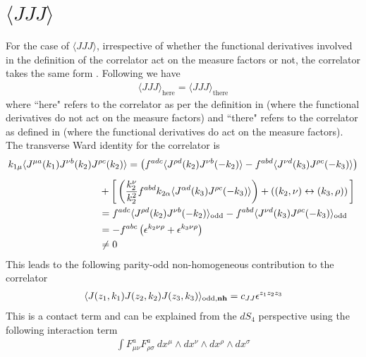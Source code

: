 \documentclass[a4paper,11pt]{article}
\begin{document}
 \section*{$\langle JJJ\rangle $}
 For the case of $\langle JJJ\rangle $, irrespective of whether the functional derivatives involved in the definition of the correlator act on the measure factors or not, the correlator takes the same form \cite{Bzowski:2017poo}. Following \cite{Bzowski:2017poo} we have
 \begin{align}
 \langle JJJ\rangle_{\text{here}}=\langle JJJ\rangle_{\text{there}}
 \end{align}
 where ``here" refers to the correlator as per the definition in \cite{Bzowski:2017poo} (where the functional derivatives do not act on the measure factors)  and ``there" refers to the correlator as defined in \cite{Bzowski:2013sza} (where the functional derivatives do act on the measure factors).  The transverse Ward identity for the correlator is \cite{Bzowski:2013sza} 
 \begin{align}
\label{WTjjj}
\begin{split}
k_{1\mu}\langle J^{\mu a}(k_1) J^{\nu b}(k_2) J^{\rho c}(k_2) \rangle &= \left(f^{adc}\langle J^{\rho d}(k_2)J^{\nu b}(-k_2) \rangle-f^{abd}\langle J^{\nu d}(k_3)J^{\rho c}(-k_3)\rangle\right)\\[5 pt]
&\hspace{-1cm}+\bigg[\left(\frac{k_2^{\nu}}{ k_2^2}f^{abd}k_{2\alpha}\langle J^{\alpha d}(k_3)J^{\rho c}(-k_3)\rangle\right)+\left((k_2, \nu) \leftrightarrow (k_3, \rho)\right)\bigg]\cr
&\hspace{-1cm}=f^{adc}\langle J^{\rho d}(k_2)J^{\nu b}(-k_2)\rangle_{\text{odd}}-f^{abd}\langle J^{\nu d}(k_3)J^{\rho c}(-k_3)\rangle_{\text{odd}}\cr
&\hspace{-1cm}=-f^{abc}\left(\epsilon^{k_2 \nu \rho}+\epsilon^{k_3 \nu \rho}\right)\cr
&\hspace{-1cm}\ne 0
\end{split}
\end{align}
This leads to the following parity-odd non-homogeneous contribution to the correlator 
 \begin{align}
 \langle J(z_1, k_1)J(z_2, k_2)J(z_3, k_3)\rangle_{\text{odd},\bf{nh}} = c_{JJ}\epsilon^{z_1z_2z_3}\label{nhpo}
 \end{align}
 This is a contact term and can be explained from the $dS_4$ perspective using the following interaction term 
 \begin{align}
 \int F^a_{\mu\nu} F^a_{\rho\sigma} ~dx^{\mu}\wedge dx^{\nu}\wedge dx^{\rho} \wedge dx^{\sigma}\label{gs}
 \end{align}
\end{document}
